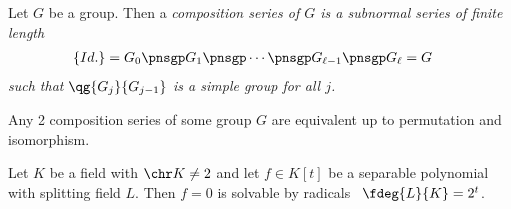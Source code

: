 \documentclass[a4paper]{article}
\begin{document}
\begin{tdefinition}
  Let \( G \) be a group.
  Then a \it{composition series} of \( G \) is a subnormal series of finite length
  \begin{align*}
    \left\{ Id. \right\} &= G_0 \pnsgp G_{1} \pnsgp \cdots \pnsgp G_{\ell-1} \pnsgp G_\ell = G
  \end{align*}
  such that \( \qg{G_j}{G_{j-1}} \) is a simple group for all \( j \).
\end{tdefinition}

\begin{ttheorem}
  Any 2 composition series of some group \( G \) are equivalent up to permutation and isomorphism.
\end{ttheorem}

\begin{ttheorem}
  Let \( K \) be a field with \( \chr K \neq 2 \) and let \( f\in K[t] \) be a separable polynomial with splitting field \( L \).
  Then \( f=0 \) is solvable by  radicals \iff~\( \fdeg{L}{K}=2^t \).
\end{ttheorem}
\end{document}
